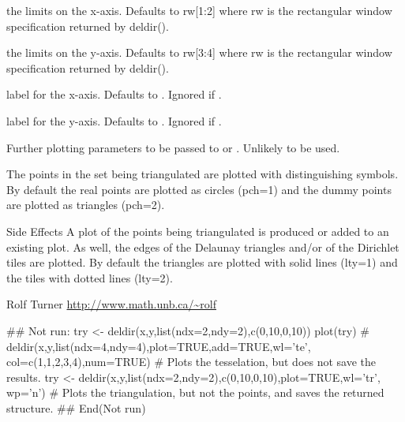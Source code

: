 \begin{Arguments}
\begin{ldescription}
\item[\code{xlim}] the limits on the x-axis.  Defaults to rw[1:2] where rw is the
rectangular window specification returned by deldir().

\item[\code{ylim}] the limits on the y-axis.  Defaults to rw[3:4] where rw is the
rectangular window specification returned by deldir().

\item[\code{xlab}] label for the x-axis.  Defaults to .  Ignored if
.

\item[\code{ylab}] label for the y-axis.  Defaults to .  Ignored if
.

\item[\code{...}] Further plotting parameters to be passed to 
 or .  Unlikely to be used.

\end{ldescription}
\end{Arguments}
\begin{Details}\relax
The points in the set being triangulated are plotted with distinguishing
symbols.  By default the real points are plotted as circles (pch=1) and the
dummy points are plotted as triangles (pch=2).
\end{Details}
\begin{Section}{Side Effects}
A plot of the points being triangulated is produced or added to
an existing plot.  As well, the edges of the Delaunay
triangles and/or of the Dirichlet tiles are plotted.  By default
the triangles are plotted with solid lines (lty=1) and the tiles
with dotted lines (lty=2).
\end{Section}
\begin{Author}\relax
Rolf Turner
\url{http://www.math.unb.ca/~rolf}
\end{Author}
\begin{SeeAlso}\relax
{}
\end{SeeAlso}
\begin{Examples}
\begin{ExampleCode}
## Not run: 
try <- deldir(x,y,list(ndx=2,ndy=2),c(0,10,0,10))
plot(try)
#
deldir(x,y,list(ndx=4,ndy=4),plot=TRUE,add=TRUE,wl='te',
       col=c(1,1,2,3,4),num=TRUE)
# Plots the tesselation, but does not save the results.
try <- deldir(x,y,list(ndx=2,ndy=2),c(0,10,0,10),plot=TRUE,wl='tr',
              wp='n')
# Plots the triangulation, but not the points, and saves the returned
structure.
## End(Not run)
\end{ExampleCode}
\end{Examples}

